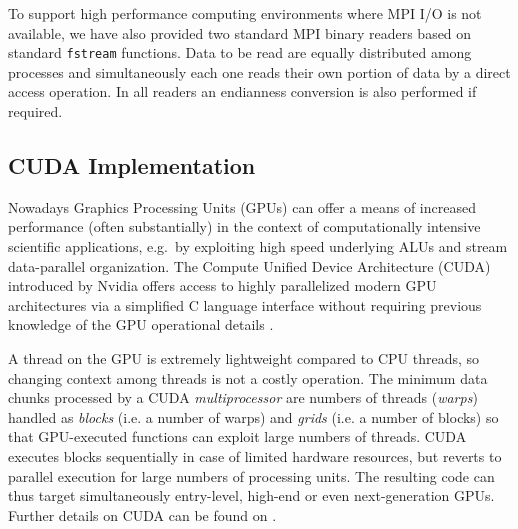 \documentclass[1p,times]{elsarticle}
\begin{document}
To support high performance computing environments where MPI I/O is not available, 
we have also provided two standard MPI binary readers based on standard {\tt fstream} functions.
Data to be read are equally distributed among processes and simultaneously each one reads
their own portion of data by a direct access operation. 
%
In all readers an endianness conversion is also performed if required.



\subsection{CUDA Implementation}
\label{cuda}
Nowadays Graphics Processing Units (GPUs) can offer a means of increased performance 
(often substantially) in the context of computationally intensive scientific applications, 
e.g.\ by exploiting high speed underlying ALUs and stream data-parallel organization. 
The Compute Unified Device Architecture (CUDA) introduced by Nvidia offers access to highly parallelized modern GPU architectures via a
simplified C language interface without requiring previous knowledge of the
GPU operational details \cite{cuda}.

A thread on the GPU is extremely lightweight compared to CPU threads, so changing context among threads is not a costly operation. The minimum 
data chunks processed by a CUDA {\it multiprocessor} are numbers of threads ({\it warps}) handled as {\it blocks} (i.e. a number of warps) and {\it grids} (i.e. a number of blocks) so that GPU-executed functions can exploit large numbers of threads. CUDA executes blocks sequentially
in case of limited hardware resources, but reverts to parallel execution for large numbers 
of processing units.  The resulting code can thus target simultaneously entry-level, high-end or even next-generation GPUs. Further details on CUDA can be found on \cite{cudaprogguide}.

\end{document}
